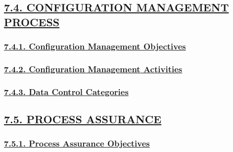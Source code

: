 \documentclass[
]{article}
\begin{document}
\hypertarget{configuration-management-process}{%
\subsection{\texorpdfstring{\protect\hyperlink{configuration-management-process-1}{7.4.
CONFIGURATION MANAGEMENT
PROCESS}}{7.4. CONFIGURATION MANAGEMENT PROCESS}}\label{configuration-management-process}}

\hypertarget{configuration-management-objectives}{%
\subsubsection{\texorpdfstring{\protect\hyperlink{configuration-management-objectives-1}{7.4.1.
Configuration Management
Objectives}}{7.4.1. Configuration Management Objectives}}\label{configuration-management-objectives}}

\hypertarget{configuration-management-activities}{%
\subsubsection{\texorpdfstring{\protect\hyperlink{configuration-management-activities-1}{7.4.2.
Configuration Management
Activities}}{7.4.2. Configuration Management Activities}}\label{configuration-management-activities}}

\hypertarget{data-control-categories}{%
\subsubsection{\texorpdfstring{\protect\hyperlink{data-control-categories-1}{7.4.3.
Data Control
Categories}}{7.4.3. Data Control Categories}}\label{data-control-categories}}

\hypertarget{process-assurance}{%
\subsection{\texorpdfstring{\protect\hyperlink{process-assurance-1}{7.5.
PROCESS ASSURANCE}}{7.5. PROCESS ASSURANCE}}\label{process-assurance}}

\hypertarget{process-assurance-objectives}{%
\subsubsection{\texorpdfstring{\protect\hyperlink{process-assurance-objectives-1}{7.5.1.
Process Assurance
Objectives}}{7.5.1. Process Assurance Objectives}}\label{process-assurance-objectives}}
\end{document}
